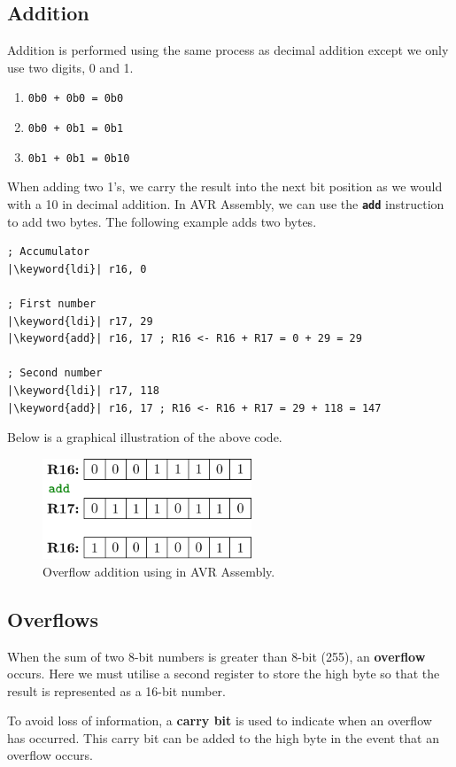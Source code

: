 \documentclass[a4paper]{report}
\newcommand{\keyword}[1]{\textcolor[rgb]{0.00,0.50,0.00}{\textbf{#1}}}
\newcommand{\keywordinline}[1]{\textcolor[rgb]{0.00,0.50,0.00}{\textbf{\texttt{#1}}}}
\begin{document}
\subsection{Addition}
Addition is performed using the same process as decimal addition except we only use two digits, 0 and 1.
\begin{enumerate}
    \item \texttt{0b0 + 0b0 = 0b0}
    \item \texttt{0b0 + 0b1 = 0b1}
    \item \texttt{0b1 + 0b1 = 0b10}
\end{enumerate}
When adding two 1's, we carry the result into the next bit position as we would with a 10 in decimal addition.
In AVR Assembly, we can use the \keywordinline{add} instruction to add two bytes. The following
example adds two bytes.
\begin{verbatim}
; Accumulator
|\keyword{ldi}| r16, 0

; First number
|\keyword{ldi}| r17, 29
|\keyword{add}| r16, 17 ; R16 <- R16 + R17 = 0 + 29 = 29

; Second number
|\keyword{ldi}| r17, 118
|\keyword{add}| r16, 17 ; R16 <- R16 + R17 = 29 + 118 = 147
\end{verbatim}
Below is a graphical illustration of the above code.
\begin{figure}[H]
    \centering
    \includegraphics[height = 3cm, keepaspectratio = true]{figures/add.pdf}
    \caption{Overflow addition using \keyword{} in AVR Assembly.} %
\end{figure}
\subsection{Overflows}
When the sum of two 8-bit numbers is greater than 8-bit (255), an \textbf{overflow} occurs.
Here we must utilise a second register to store the high byte so that the result is represented as
a 16-bit number.

To avoid loss of information, a \textbf{carry bit} is used to indicate when an overflow has occurred.
This carry bit can be added to the high byte in the event that an overflow occurs.
\end{document}
